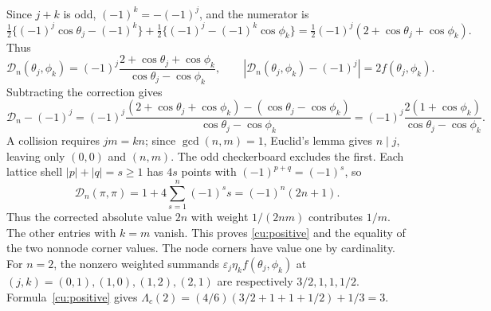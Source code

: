 Since $j+k$ is odd, $(-1)^k=-(-1)^j$, and the numerator is
\[
\tfrac12\{(-1)^j\cos\theta_j-(-1)^k\}
+\tfrac12\{(-1)^j-(-1)^k\cos\phi_k\}
=\tfrac12(-1)^j(2+\cos\theta_j+\cos\phi_k).
\]
Thus
\[
 \mathcal{D}_n(\theta_j,\phi_k)=(-1)^j
       \frac{2+\cos\theta_j+\cos\phi_k}{\cos\theta_j-\cos\phi_k},
 \qquad |\mathcal{D}_n(\theta_j,\phi_k)-(-1)^j|=2f(\theta_j,\phi_k).
\]
Subtracting the correction gives
\[
\mathcal D_n-(-1)^j=(-1)^j
\frac{(2+\cos\theta_j+\cos\phi_k)-(\cos\theta_j-\cos\phi_k)}
{\cos\theta_j-\cos\phi_k}
=(-1)^j\frac{2(1+\cos\phi_k)}{\cos\theta_j-\cos\phi_k}.
\]
A collision requires $jm=kn$; since $\gcd(n,m)=1$, Euclid's lemma gives
$n\mid j$, leaving only $(0,0)$ and $(n,m)$. The odd checkerboard
excludes the first. Each lattice shell $|p|+|q|=s\geq1$ has $4s$
points with $(-1)^{p+q}=(-1)^s$, so
\[
\mathcal D_n(\pi,\pi)=1+4\sum_{s=1}^n(-1)^ss=(-1)^n(2n+1).
\]
Thus the corrected absolute value $2n$
with weight $1/(2nm)$ contributes $1/m$. The other entries with $k=m$
vanish. This proves \eqref{cu:positive} and the equality of the two
nonnode corner values. The node corners have value one by cardinality.
For $n=2$, the nonzero weighted summands
$\varepsilon_j\eta_k f(\theta_j,\phi_k)$ at
$(j,k)=(0,1),(1,0),(1,2),(2,1)$ are respectively
$3/2,1,1,1/2$. Formula~\eqref{cu:positive} gives
$\Lambda_c(2)=(4/6)(3/2+1+1+1/2)+1/3=3$.


